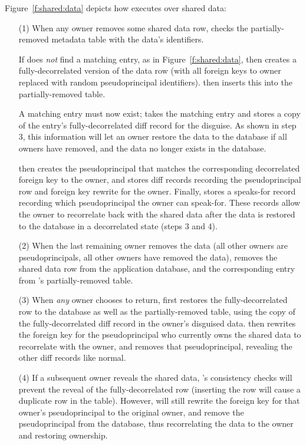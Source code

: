 Figure~\ref{f:shared:data} depicts how \sys executes \sys over shared
data:
%
\begin{enumerate}
    \item[(1)] When any owner removes some shared data row, \sys checks the
        partially-removed metadata table with the data's identifiers.
        
        If \sys does \emph{not} find a matching entry, as in
        Figure~\ref{f:shared:data}, then \sys creates a fully-decorrelated
        version of the data row (with all foreign keys to owner replaced with
        random pseudoprincipal identifiers). \sys then inserts this into the
        partially-removed table.

        A matching entry must now exist; \sys takes the matching entry and
        stores a copy of the entry's fully-decorrelated diff record for the
        disguise.  As shown in step 3, this information will let an
        owner restore the data to the database if all owners have removed, and
        the data no longer exists in the database.

        \sys then creates the pseudoprincipal that matches the corresponding
        decorrelated foreign key to the owner, and stores diff records recording
        the pseudoprincipal row and foreign key rewrite for the owner. Finally,
        \sys stores a speaks-for record recording which pseudoprincipal the
        owner can speak-for. These records allow the owner to recorrelate back
        with the shared data after the data is restored to the database in a
        decorrelated state (steps 3 and 4).

\item[(2)]
        When the last remaining owner removes the data (all other owners are
        pseudoprincipals, \ie all other owners have removed the data), \sys
        removes the shared data row from the application database, and the
        corresponding entry from \sys's partially-removed table.
%

\item[(3)]
When \emph{any} owner chooses to return, \sys first restores the
fully-decorrelated row to the database as well as the partially-removed table,
        using the copy of the fully-decorrelated diff record in
the owner's disguised data.  \sys then rewrites the foreign key for the
pseudoprincipal who currently owns the shared data to recorrelate with the
owner, and removes that pseudoprincipal, revealing the other diff records like
normal. 
%

\item[(4)] If a subsequent owner reveals the shared data, \sys's consistency
    checks will prevent the reveal of the fully-decorrelated row (inserting the
        row will cause a duplicate row in the table). However, \sys will still
        rewrite the foreign key for that owner's pseudoprincipal to the original
        owner, and remove the pseudoprincipal from the database, thus
        recorrelating the data to the owner and restoring ownership.
%
\end{enumerate}

